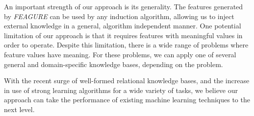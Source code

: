 \documentclass[letterpaper]{article} %
\theoremstyle{definition}
\begin{document}
An important strength of our approach is its generality. The features generated by \emph{FEAGURE}
can be used by any induction algorithm, allowing us to inject external knowledge in a general,
algorithm independent manner. One potential limitation of our approach is that it requires features
with meaningful values in order to operate. Despite this limitation, there is a wide range of problems
where feature values have meaning. For these problems, we can apply one of several general and
domain-specific knowledge bases, depending on the problem.

With the recent surge of well-formed relational knowledge bases, and the increase in use
of strong learning algorithms for a wide variety of tasks, we believe our approach can take the
performance of existing machine learning techniques to the next level.

\clearpage


\end{document}
